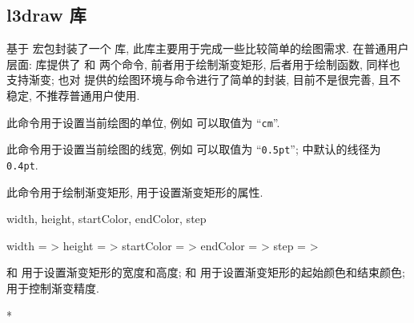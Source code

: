 \documentclass[
  hyper, 
  lang = cn, 
  class = l3doc,
  classOption={11pt},
  sect = {load=false},
]{../../zlatex/code/ztex}
\begin{document}
\clearpage
\subsection{l3draw 库}
\zTikZ{} 基于  宏包封装了一个  库, 此库主要用于完成一些比较简单的绘图需求. 
在普通用户层面:  库提供了  和  两个命令, 前者用于绘制渐变矩形,
后者用于绘制函数, 同样也支持渐变; \ztikz{} 也对  提供的绘图环境与命令进行了简单的封装, 
目前不是很完善, 且不稳定, 不推荐普通用户使用.


\begin{function}[added=2025-05-15]{\zdrawSetUnit}
  \begin{syntax}
  \end{syntax}
  此命令用于设置当前绘图的单位, 例如  可以取值为 ``\texttt{cm}''.
\end{function}


\begin{function}[added=2025-05-15]{\zdrawSetPathWidth}
  \begin{syntax}
  \end{syntax}
  此命令用于设置当前绘图的线宽, 例如  可以取值为 ``\texttt{0.5pt}'';
   中默认的线径为 \texttt{0.4pt}.
\end{function}


\begin{function}[added=2025-05-15]{\zrule}
  \begin{syntax}
  \end{syntax}
  此命令用于绘制渐变矩形,  用于设置渐变矩形的属性.
\end{function}

\begin{keyval}[parent=ztikz/zdraw/zrule]{width, height, startColor, endColor, step}
  \begin{syntax}
    width      = >
    height     = >
    startColor = >
    endColor   = >
    step       = >
  \end{syntax}
   和  用于设置渐变矩形的宽度和高度; 
   和  用于设置渐变矩形的起始颜色和结束颜色;
   用于控制渐变精度.
\end{keyval}
\begin{DocExample}*
\zrule[width=10, startColor=red, step=1]
\end{DocExample}
\end{document}
